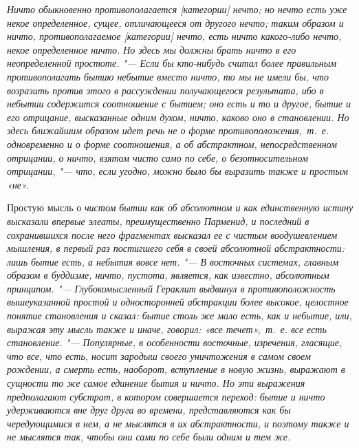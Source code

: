 \em{Ничто} обыкновенно противополагается [категории]
\em{нечто}; но нечто есть уже некое определенное,
сущее, отличающееся от другого \em{нечто}; таким
образом и ничто, противополагаемое [категории] нечто, есть ничто
какого-либо нечто, некое определенное ничто. Но здесь мы должны брать ничто
в его неопределенной простоте. "--- Если бы кто-нибудь считал более правильным
противополагать бытию \em{небытие} вместо ничто, то мы
не имели бы, что возразить против этого в рассуждении получающегося
результата, ибо в \em{небытии} содержится соотношение
с \em{бытием}; оно есть и то и другое, бытие и его
отрицание, высказанные одним духом, ничто, каково оно в становлении. Но
здесь ближайшим образом идет речь не о форме противоположения,~т.~е.
одновременно и о форме \em{соотношения}, а об
абстрактном, непосредственном отрицании, о ничто, взятом чисто само по
себе, о безотносительном отрицании, "--- что, если угодно, можно было бы
выразить также и простым «\em{не}».

Простую мысль о \em{чистом бытии} как об абсолютном и
как единственную истину высказали впервые \em{элеаты},
преимущественно \em{Парменид}, и последний в
сохранившихся после него фрагментах высказал ее с чистым воодушевлением
мышления, в первый раз постигшего себя в своей абсолютной абстрактности:
\em{лишь бытие есть}, \em{а
небытия вовсе нет}. "--- В восточных системах, главным образом в буддизме,
\em{ничто}, пустота, является, как известно,
абсолютным принципом. "--- Глубокомысленный \em{Гераклит}
выдвинул в противоположность вышеуказанной простой и односторонней
абстракции более высокое, целостное понятие становления и сказал:
\em{бытие столь же мало есть},
\em{как и небытие}, или, выражая эту мысль также и
иначе, говорил: «все\em{ течет}»,~т.~е. все есть
\em{становление}. "--- Популярные, в особенности
восточные, изречения, гласящие, что все, что есть, носит зародыш своего
уничтожения в самом своем рождении, а смерть есть, наоборот, вступление в
новую жизнь, выражают в сущности то же самое единение бытия и ничто. Но эти
выражения предполагают субстрат, в котором совершается переход: бытие и
ничто удерживаются вне друг друга во времени, представляются как бы
чередующимися в нем, а не мыслятся в их абстрактности, и поэтому также и не
мыслятся так, чтобы они сами по себе были одним и тем же.

